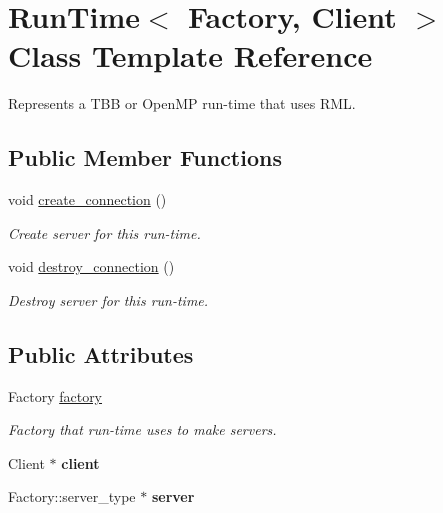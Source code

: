 \hypertarget{classRunTime}{}\section{Run\+Time$<$ Factory, Client $>$ Class Template Reference}
\label{classRunTime}


Represents a T\+B\+B or Open\+M\+P run-\/time that uses R\+M\+L.  


\subsection*{Public Member Functions}
\begin{DoxyCompactItemize}
\item 
\hypertarget{classRunTime_a4fd73802db4a575a6d3652e1d8649849}{}void \hyperlink{classRunTime_a4fd73802db4a575a6d3652e1d8649849}{create\+\_\+connection} ()\label{classRunTime_a4fd73802db4a575a6d3652e1d8649849}

\begin{DoxyCompactList}\small\item\em Create server for this run-\/time. \end{DoxyCompactList}\item 
\hypertarget{classRunTime_a8be272ee293a1f67d95802eaef6b0d26}{}void \hyperlink{classRunTime_a8be272ee293a1f67d95802eaef6b0d26}{destroy\+\_\+connection} ()\label{classRunTime_a8be272ee293a1f67d95802eaef6b0d26}

\begin{DoxyCompactList}\small\item\em Destroy server for this run-\/time. \end{DoxyCompactList}\end{DoxyCompactItemize}
\subsection*{Public Attributes}
\begin{DoxyCompactItemize}
\item 
\hypertarget{classRunTime_abb351efaa0d0d7472ae0a49f585532bf}{}Factory \hyperlink{classRunTime_abb351efaa0d0d7472ae0a49f585532bf}{factory}\label{classRunTime_abb351efaa0d0d7472ae0a49f585532bf}

\begin{DoxyCompactList}\small\item\em Factory that run-\/time uses to make servers. \end{DoxyCompactList}\item 
\hypertarget{classRunTime_aa09132541a16d22891d1d68fc00d5188}{}Client $\ast$ {\bfseries client}\label{classRunTime_aa09132541a16d22891d1d68fc00d5188}

\item 
\hypertarget{classRunTime_a8896940351fb2f02204e048d5740ec80}{}Factory\+::server\+\_\+type $\ast$ {\bfseries server}\label{classRunTime_a8896940351fb2f02204e048d5740ec80}

\end{DoxyCompactItemize}


